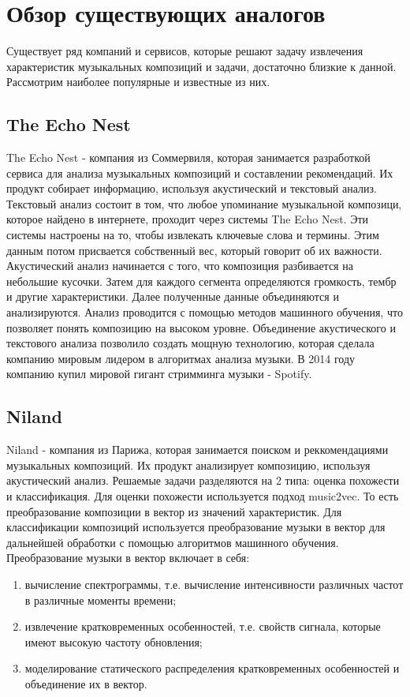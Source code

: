 \section{Обзор существующих аналогов}
\label{sec:analogues}

Существует ряд компаний и сервисов, которые решают задачу извлечения характеристик музыкальных композиций и задачи, достаточно близкие к данной. Рассмотрим наиболее популярные и известные из них.

\subsection{The Echo Nest}
\label{sec:analogues:ten}
The Echo Nest - компания из Соммервиля, которая занимается разработкой сервиса для анализа музыкальных композиций и составлении рекомендаций. Их продукт собирает информацию, используя акустический и текстовый анализ. Текстовый анализ состоит в том, что любое упоминание музыкальной композици, которое найдено в интернете, проходит через системы The Echo Nest. Эти системы настроены на то, чтобы извлекать ключевые слова и термины. Этим данным потом присвается собственный вес, который говорит об их важности. Акустический анализ начинается с того, что композиция разбивается на небольшие кусочки. Затем для каждого сегмента определяются громкость, тембр и другие характеристики. Далее полученные данные объединяются и анализируются. Анализ проводится с помощью методов машинного обучения, что позволяет понять композицию на высоком уровне. Объединение акустического и текстового анализа позволило создать мощную технологию, которая сделала компанию мировым лидером в алгоритмах анализа музыки. В 2014 году компанию купил мировой гигант стримминга музыки - Spotify.

\subsection{Niland}
\label{sec:analogues:niland}
Niland - компания из Парижа, которая занимается поиском и реккомендациями музыкальных композиций. Их продукт анализирует композицию, используя акустический анализ. Решаемые задачи разделяются на 2 типа: оценка похожести и классификация. Для оценки похожести используется подход music2vec. То есть преобразование композиции в вектор из значений характеристик. Для классификации композиций используется преобразование музыки в вектор для дальнейшей обработки с помощью алгоритмов машинного обучения. Преобразование музыки в вектор включает в себя:
\begin{enumerate}
    \item вычисление спектрограммы, т.е. вычисление интенсивности различных частот в различные моменты времени;
    \item извлечение кратковременных особенностей, т.е. свойств сигнала, \linebreak которые имеют высокую частоту обновления;
    \item моделирование статического распределения кратковременных особенностей и объединение их в вектор.
\end{enumerate}

